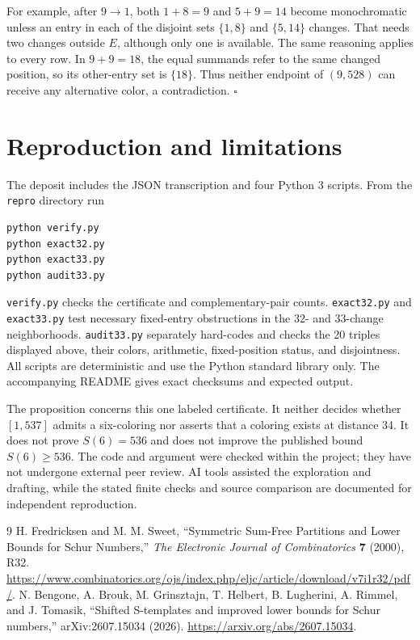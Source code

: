 \documentclass[11pt,a4paper]{article}
\begin{document}
For example, after $9\to1$, both $1+8=9$ and $5+9=14$ become monochromatic unless an entry in each of the disjoint sets $\{1,8\}$ and $\{5,14\}$ changes. That needs two changes outside $E$, although only one is available. The same reasoning applies to every row. In $9+9=18$, the equal summands refer to the same changed position, so its other-entry set is $\{18\}$. Thus neither endpoint of $(9,528)$ can receive any alternative color, a contradiction. \hfill$\square$

\section{Reproduction and limitations}

The deposit includes the JSON transcription and four Python 3 scripts. From the \texttt{repro} directory run
\begin{verbatim}
python verify.py
python exact32.py
python exact33.py
python audit33.py
\end{verbatim}
\texttt{verify.py} checks the certificate and complementary-pair counts. \texttt{exact32.py} and \texttt{exact33.py} test necessary fixed-entry obstructions in the 32- and 33-change neighborhoods. \texttt{audit33.py} separately hard-codes and checks the 20 triples displayed above, their colors, arithmetic, fixed-position status, and disjointness. All scripts are deterministic and use the Python standard library only. The accompanying README gives exact checksums and expected output.

The proposition concerns this one labeled certificate. It neither decides whether $[1,537]$ admits a six-coloring nor asserts that a coloring exists at distance 34. It does not prove $S(6)=536$ and does not improve the published bound $S(6)\geq536$. The code and argument were checked within the project; they have not undergone external peer review. AI tools assisted the exploration and drafting, while the stated finite checks and source comparison are documented for independent reproduction.

\begin{thebibliography}{9}
 H. Fredricksen and M. M. Sweet, ``Symmetric Sum-Free Partitions and Lower Bounds for Schur Numbers,'' \emph{The Electronic Journal of Combinatorics} \textbf{7} (2000), R32. \url{https://www.combinatorics.org/ojs/index.php/eljc/article/download/v7i1r32/pdf/}.
 N. Bengone, A. Brouk, M. Grinsztajn, T. Helbert, B. Lugherini, A. Rimmel, and J. Tomasik, ``Shifted S-templates and improved lower bounds for Schur numbers,'' arXiv:2607.15034 (2026). \url{https://arxiv.org/abs/2607.15034}.
\end{thebibliography}
\end{document}
